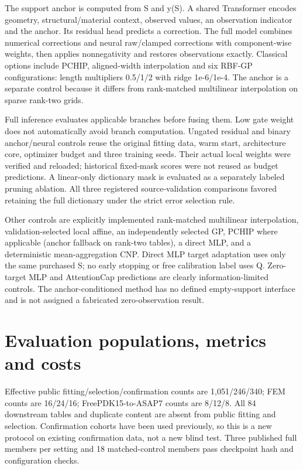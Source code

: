 \documentclass[10pt,twocolumn]{article}
\begin{document}
The support anchor is computed from S and y(S). A shared Transformer encodes geometry, structural/material context, observed values, an observation indicator and the anchor. Its residual head predicts a correction. The full model combines numerical corrections and neural raw/clamped corrections with component-wise weights, then applies nonnegativity and restores observations exactly. Classical options include PCHIP, aligned-width interpolation and six RBF-GP configurations: length multipliers 0.5/1/2 with ridge 1e-6/1e-4. The anchor is a separate control because it differs from rank-matched multilinear interpolation on sparse rank-two grids.

Full inference evaluates applicable branches before fusing them. Low gate weight does not automatically avoid branch computation. Ungated residual and binary anchor/neural controls reuse the original fitting data, warm start, architecture core, optimizer budget and three training seeds. Their actual local weights were verified and reloaded; historical fixed-mask scores were not reused as budget predictions. A linear-only dictionary mask is evaluated as a separately labeled pruning ablation. All three registered source-validation comparisons favored retaining the full dictionary under the strict error selection rule.

Other controls are explicitly implemented rank-matched multilinear interpolation, validation-selected local affine, an independently selected GP, PCHIP where applicable (anchor fallback on rank-two tables), a direct MLP, and a deterministic mean-aggregation CNP. Direct MLP target adaptation uses only the same purchased S; no early stopping or free calibration label uses Q. Zero-target MLP and AttentionCap predictions are clearly information-limited controls. The anchor-conditioned method has no defined empty-support interface and is not assigned a fabricated zero-observation result.

\section*{Evaluation populations, metrics and costs}

Effective public fitting/selection/confirmation counts are 1,051/246/340; FEM counts are 16/24/16; FreePDK15-to-ASAP7 counts are 8/12/8. All 84 downstream tables and duplicate content are absent from public fitting and selection. Confirmation cohorts have been used previously, so this is a new protocol on existing confirmation data, not a new blind test. Three published full members per setting and 18 matched-control members pass checkpoint hash and configuration checks.
\end{document}
